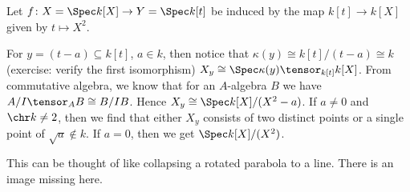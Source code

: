 Let $f\colon X = \Spec k[X]\to Y = \Spec k[t]$ be induced by the map
 $k[t] \to k[X]$ given by $t\mapsto X^2$.

For $y  = (t-a) \subseteq k[t]$, $a \in k$, then notice that $\kappa(y) \cong k[t]/(t-a) \cong k$
(exercise: verify the first isomorphism)
$X_y \cong \Spec \kappa(y)\tensor_{k[t]} k[X]$. From commutative algebra, we know
that for an  $A$-algebra $B$ we have $A/I \tensor_A B\cong B/{IB}$.
Hence $X_y \cong \Spec k[X]/(X^2-a)$. If $a\neq 0$ and $\chr k\neq 2$, then we
find that either $X_y$ consists of two distinct points or a single point
of $\sqrt{a} \notin k$. If $a = 0$, then we get $\Spec k[X]/(X^2)$.

This can be thought of like collapsing a rotated parabola to a line. There
is an image missing here.
